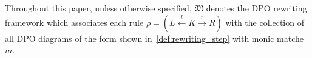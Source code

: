 

% 

%  
Throughout this paper, unless otherwise specified, 
\(\mathfrak{M}\) denotes the DPO rewriting framework which associates each rule \( \rho = (L \overset{l}{\leftarrow} K \overset{r}{\rightarrow} R) \) with the collection of all DPO diagrams of the form shown in~\autoref{def:rewriting_step}
with monic matche $m$.